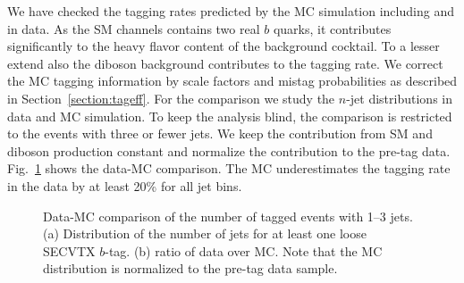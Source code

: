 We have checked the tagging rates predicted by the \Zj MC simulation
including \Zcc and \Zbb in data.  As the SM \ttbar channels contains
two real $b$ quarks, it contributes significantly to the heavy flavor
content of the background cocktail. To a lesser extend also the
diboson background contributes to the tagging rate. We correct the MC
tagging information by scale factors and mistag probabilities as
described in Section~\ref{section:tageff}. For the comparison we study
the $n$-jet distributions in data and MC simulation.  To keep the
analysis blind, the comparison is restricted to the events with three
or fewer jets.  We keep the contribution from SM \ttbar and diboson
production constant and normalize the \Zj contribution to the pre-tag
data. Fig.~\ref{fig:njet_tag} shows the data-MC comparison. The MC
underestimates the tagging rate in the data by at least 20\%
for all jet bins.

\begin{figure}[t]
  \begin{center}
  \end{center}
  \caption{Data-MC comparison of the number of tagged events with 1--3
    jets. (a) Distribution of the number of jets for at least one
    loose SECVTX $b$-tag. (b) ratio of data over MC. Note that the MC
    distribution is normalized to the pre-tag data sample.}
  \label{fig:njet_tag}
\end{figure}

